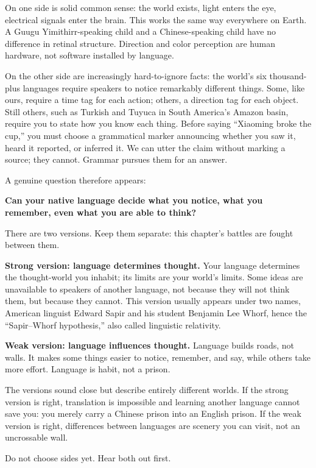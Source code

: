 On one side is solid common sense: the world exists, light enters the eye, electrical signals enter the brain. This works the same way everywhere on Earth. A Guugu Yimithirr-speaking child and a Chinese-speaking child have no difference in retinal structure. Direction and color perception are human hardware, not software installed by language.

On the other side are increasingly hard-to-ignore facts: the world's six thousand-plus languages require speakers to notice remarkably different things. Some, like ours, require a time tag for each action; others, a direction tag for each object. Still others, such as Turkish and Tuyuca in South America's Amazon basin, require you to state how you know each thing. Before saying ``Xiaoming broke the cup,'' you must choose a grammatical marker announcing whether you saw it, heard it reported, or inferred it. We can utter the claim without marking a source; they cannot. Grammar pursues them for an answer.

A genuine question therefore appears:

\textbf{Can your native language decide what you notice, what you remember, even what you are able to think?}

There are two versions. Keep them separate: this chapter's battles are fought between them.

\textbf{Strong version: language determines thought.} Your language determines the thought-world you inhabit; its limits are your world's limits. Some ideas are unavailable to speakers of another language, not because they will not think them, but because they cannot. This version usually appears under two names, American linguist Edward Sapir and his student Benjamin Lee Whorf, hence the ``Sapir--Whorf hypothesis,'' also called linguistic relativity.

\textbf{Weak version: language influences thought.} Language builds roads, not walls. It makes some things easier to notice, remember, and say, while others take more effort. Language is habit, not a prison.

The versions sound close but describe entirely different worlds. If the strong version is right, translation is impossible and learning another language cannot save you: you merely carry a Chinese prison into an English prison. If the weak version is right, differences between languages are scenery you can visit, not an uncrossable wall.

Do not choose sides yet. Hear both out first.

